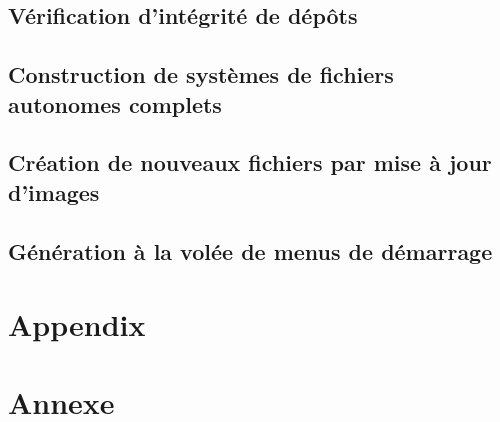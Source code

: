 \ml
{\section{\todo}}
{\section{Vérification d’intégrité de dépôts}}

\ml
{\section{\todo}}
{\section{Construction de systèmes de fichiers autonomes complets}}

\ml
{\section{\todo}}
{\section{Création de nouveaux fichiers par mise à jour d’images}}

\ml
{\section{\todo}}
{\section{Génération à la volée de menus de démarrage}}



\appendix

\ml
{\chapter{Appendix}}
{\chapter{Annexe}}
\pagebreak





\singlespacing




